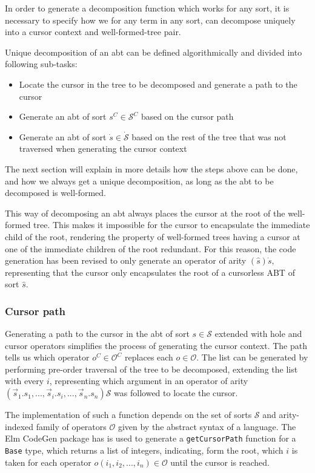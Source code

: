 \documentclass[sigplan,review]{acmart}
\newcommand{\abt}{\textsf{abt}\xspace}
\begin{document}
In order to generate a decomposition function which works for any sort,
it is necessary to specify how we for any term in any sort,
can decompose uniquely into a cursor context and well-formed-tree pair.

Unique decomposition of an \abt can be defined algorithmically and divided
into following sub-tasks:
\begin{itemize}
  \item Locate the cursor in the tree to be decomposed and generate a path to the cursor
  \item Generate an \abt of sort $s^C \in \mathcal{S}^C$ based on the cursor path
  \item Generate an \abt of sort $\dot{s} \in \dot{\mathcal{S}}$
        based on the rest of the tree that was not traversed
        when generating the cursor context
\end{itemize}

The next section will explain in more details how the steps above can be done,
and how we always get a unique decomposition, as long as the \abt to be decomposed is well-formed.

This way of decomposing an \abt always places the cursor at the root of the
well-formed tree. This makes it impossible for the cursor to encapsulate the immediate
child of the root, rendering the property of well-formed trees having a cursor at one of the immediate children of the root redundant. For this reason, the code generation
has been revised to only generate an operator of arity $(\hat{s})\dot{s}$,
representing that the cursor only encapsulates the root of a cursorless ABT
of sort $\hat{s}$.

\subsubsection{Cursor path}

Generating a path to the cursor in the \abt of sort $s \in \mathcal{S}$ extended with
hole and cursor operators simplifies the process of generating the cursor context. The path tells us
which operator $o^C \in \mathcal{O}^C$ replaces each $o \in \mathcal{O}$.
The list can be generated by performing pre-order traversal of the tree to be decomposed,
extending the list with every $i$, representing which argument in an operator of
arity $(\vec{s}_1.s_1, ... , \vec{s}_i.s_i, ..., \vec{s}_n.s_n)\mathcal{S}$ was
followed to locate the cursor. 

The implementation of such a function depends on the set of sorts $\mathcal{S}$
and arity-indexed family of operators $\mathcal{O}$ given by the abstract syntax
of a language. The Elm CodeGen package\cite{elm-codegen-package} has is used to
generate a \texttt{getCursorPath} function for a \texttt{Base} type, which returns a list of integers, indicating, form the root, which $i$ is taken for each operator $o(i_1,i_2,...,i_n) \in \mathcal{O}$ until the cursor is reached.
\end{document}
